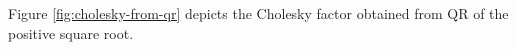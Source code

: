 Figure \ref{fig:cholesky-from-qr} depicts the Cholesky factor obtained from QR of the positive square root.

\begin{illustrationfigure}[H]
  \centering
  
  \caption{For $B=A^{1/2}=QR$, the choice $L=R^*$ satisfies $A=LL^*$; positive definiteness makes $L$ unique.}
  \label{fig:cholesky-from-qr}
\end{illustrationfigure}
